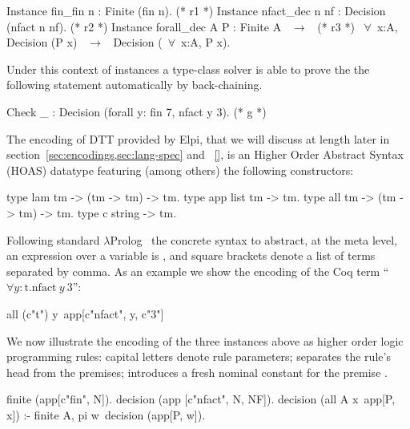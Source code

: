\documentclass[sigconf,natbib=false]{acmart}
\begin{document}
\begin{coqcode}
Instance fin_fin n : Finite (fin n).             (* r1 *)
Instance nfact_dec n nf : Decision (nfact n nf). (* r2 *)
Instance forall_dec A P : Finite A ~$\to$~            (* r3 *)
  ~$\forall$~x:A, Decision (P x) ~$\to$~ Decision (~$\forall$~x:A, P x).
\end{coqcode}

\noindent Under this context of instances a type-class solver is able to prove
the the following statement automatically by back-chaining.

\begin{coqcode}
  Check _ : Decision (forall y: fin 7, nfact y 3).  (* g *)
\end{coqcode}

\noindent
The encoding of DTT provided by Elpi, that we will discuss at length later in
section~\ref{sec:encodings,sec:lang-spec} and ~\ref{}, is an Higher Order Abstract
Syntax (HOAS) datatype  featuring (among others) the following
constructors:

\begin{elpicode}
type lam  tm -> (tm -> tm) -> tm.     %
type app  list tm -> tm.              %
type all  tm -> (tm -> tm) -> tm.     %
type c    string -> tm.               %
\end{elpicode}

\noindent
Following standard $\lambda$Prolog~\cite{miller_nadathur_2012}
the concrete syntax to abstract, at the meta level, an expression
 over a variable 
is , and square brackets denote a list of
terms separated by comma. As an example we show the encoding of the Coq term
``$\forall y:\mathrm{t}.\mathrm{nfact}~ y~ 3$'':

\begin{elpicode}
all (c"t") y\ app[c"nfact", y, c"3"]
\end{elpicode}

\noindent
We now illustrate the encoding of the three instances above as higher order
logic programming rules: capital letters denote rule
parameters; \elpiIn{:-} separates the rule's head from the premises;
 introduces a fresh nominal constant 
for the premise .

\begin{elpicode}
finite (app[c"fin", N]).                             %
decision (app [c"nfact", N, NF]).                    %
decision (all A x\ app[P, x]) :- finite A,           %
  pi w\ decision (app[P, w]).
\end{elpicode}
\end{document}
